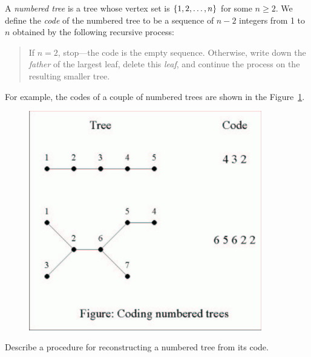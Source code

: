\documentclass[12pt,twoside]{article}
\begin{document}
\begin{problem}[20 points]
A \emph{numbered tree} is a tree whose vertex set is
$\left\{1,2,\dots,n\right\}$ for some $n \geq 2$.  We define the \emph{code} of
the numbered tree to be a sequence of $n-2$ integers from 1 to $n$
obtained by the following recursive process:
\begin{quotation}
If $n=2$, stop---the code is the empty sequence.  Otherwise, write down
the \emph{father} of the largest leaf, delete this \emph{leaf}, and
continue the process on the resulting smaller tree.
\end{quotation}

For example, the codes of a couple of numbered trees are shown in
the Figure~\ref{codetrees}.

\begin{figure}[htb]
\begin{center}
\includegraphics[width=4in]{figures/n-2}
\end{center}
\caption{}
\label{codetrees}
\end{figure}

\bparts

\ppart Describe a procedure for reconstructing a numbered tree from
its code.

\end{problem}
\end{document}
